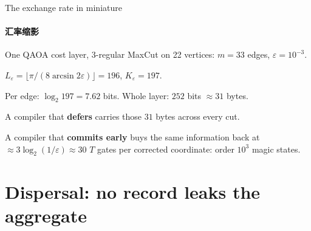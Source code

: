 \documentclass[aspectratio=169,10pt]{beamer}
\newif\ifzh \zhfalse
\newcommand{\bl}[2]{\ifzh #2\else #1\fi}
\theoremstyle{definition}
\newcommand{\hd}[1]{\textbf{\color{calblue}#1}}
\newcommand{\zhsub}[1]{\ifzh\else\framesubtitle{#1}\fi}
\begin{document}
\begin{frame}{\bl{The exchange rate in miniature}{汇率缩影}}
  \zhsub{汇率缩影}
  \vfill
  \begin{center}
  \begin{minipage}{0.90\textwidth}
    \begin{block}{}
      \normalsize
      One QAOA cost layer, 3-regular MaxCut on 22 vertices:
      $m=33$ edges, $\varepsilon=10^{-3}$.
      \smallskip

      $L_\varepsilon=\lfloor\pi/(8\arcsin2\varepsilon)\rfloor=196$,
      \quad $K_\varepsilon=197$.
      \smallskip

      Per edge: $\log_2 197=7.62$ bits. \quad
      Whole layer: \alert{$252$ bits $\approx31$ bytes}.
      \bigskip

      A compiler that \hd{defers} carries those $31$ bytes across every cut.
      \smallskip

      A compiler that \hd{commits early} buys the same information back at
      $\approx3\log_2(1/\varepsilon)\approx30$ $T$ gates per corrected
      coordinate: \alert{order $10^3$ magic states.}
    \end{block}
  \end{minipage}
  \end{center}
  \vfill
\end{frame}

\section[\bl{3. Dispersal}{3. Dispersal}]{\bl{Dispersal: no record leaks the aggregate}%
             {Dispersal：为什么没有记录泄露 aggregate}}
\end{document}
